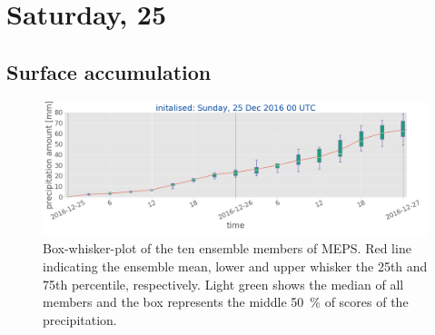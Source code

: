 
\section{Saturday, \SI{25}{\dec}}\label{sec:2512}



\subsection{Surface accumulation}

\begin{figure}[t]
	\includegraphics[width=\textwidth]{./fig_boxplot_sfc/20161225_0}
	\caption{Box-whisker-plot of the ten ensemble members of MEPS. Red line indicating the ensemble mean, lower and upper whisker the 25th and 75th percentile, respectively. Light green shows the median of all members and the box represents the middle \SI{50}{\percent} of scores of the precipitation.}\label{fig:boxplt25}
\end{figure}

